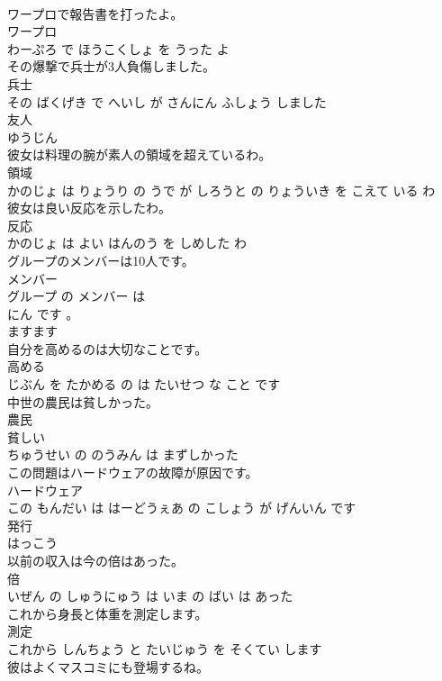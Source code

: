 \documentclass[8pt]{extreport}
\begin{document}
\begin{CJK}{UTF8}{min}
\\	ワープロで報告書を打ったよ。	
\\	ワープロ 
\\	わーぷろ で ほうこくしょ を うった よ			
\\	その爆撃で兵士が3人負傷しました。	
\\	兵士 
\\	その ばくげき で へいし が さんにん ふしょう しました			
\\	友人	
\\	ゆうじん			
\\	彼女は料理の腕が素人の領域を超えているわ。	
\\	領域 
\\	かのじょ は りょうり の うで が しろうと の りょういき を こえて いる わ			
\\	彼女は良い反応を示したわ。	
\\	反応 
\\	かのじょ は よい はんのう を しめした わ			
\\	グループのメンバーは10人です。	
\\	メンバー 
\\	グループ の メンバー は 
\\	にん です 。			
\\	ますます	
\\	自分を高めるのは大切なことです。	
\\	高める 
\\	じぶん を たかめる の は たいせつ な こと です			
\\	中世の農民は貧しかった。	
\\	農民 
\\	貧しい 
\\	ちゅうせい の のうみん は まずしかった			
\\	この問題はハードウェアの故障が原因です。	
\\	ハードウェア 
\\	この もんだい は はーどうぇあ の こしょう が げんいん です			
\\	発行	
\\	はっこう			
\\	以前の収入は今の倍はあった。	
\\	倍 
\\	いぜん の しゅうにゅう は いま の ばい は あった			
\\	これから身長と体重を測定します。	
\\	測定 
\\	これから しんちょう と たいじゅう を そくてい します			
\\	彼はよくマスコミにも登場するね。	

\end{CJK}
\end{document}

